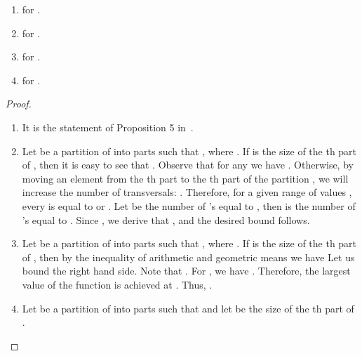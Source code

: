 \documentclass[a4paper,USenglish]{lipics}
\theoremstyle{definition}
\begin{document}
\begin{lemma}
\label{lemma:trans}
\begin{enumerate}
\item  for .
\item  for .
\item  for .
\item  for .
\end{enumerate}
\end{lemma}
\begin{proof}
\begin{enumerate}
\item It is the statement of Proposition 5 in~\cite{Ivan2009}.
\item Let  be a partition of  into  parts such that , where . If  is the size of the th part of , then it is easy to see that . Observe that for any  we have . Otherwise, by moving an element from the th part to the th part of the partition , we will increase the number of transversals: . Therefore, for a given range of values , every  is equal to  or . Let  be the number of 's equal to , then  is the number of 's equal to . Since , we derive that , and the desired bound follows.
\item Let  be a partition of  into  parts such that , where . If  is the size of the th part of , then by the inequality of arithmetic and geometric means we have  Let us bound the right hand side. Note that . For , we have . Therefore, the largest value of the function  is achieved at .
Thus, .
\item Let  be a partition of  into  parts such that  and let  be the size of the th part of .


\end{enumerate}
\end{proof}
\end{document}
